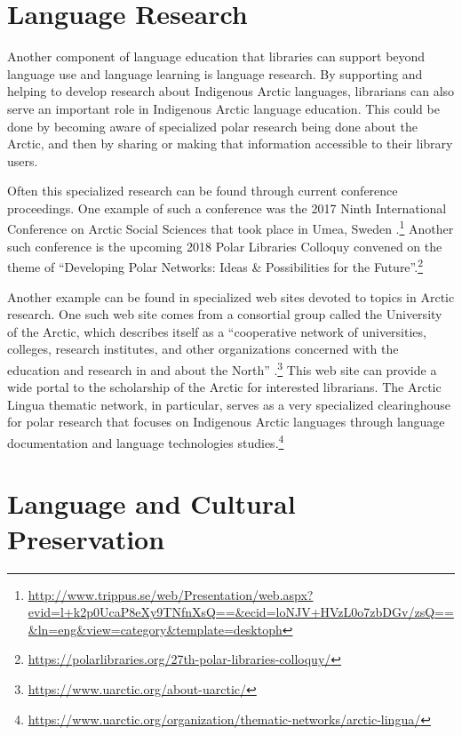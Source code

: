 \documentclass[a4paper,
fontsize=11pt,
oneside,
numbers=noperiodatend,
parskip=half-,
bibliography=totoc,
final
]{scrartcl}
\begin{document}
\hypertarget{language-research}{%
\section{Language Research}\label{language-research}}

Another component of language education that libraries can support
beyond language use and language learning is language research. By
supporting and helping to develop research about Indigenous Arctic
languages, librarians can also serve an important role in Indigenous
Arctic language education. This could be done by becoming aware of
specialized polar research being done about the Arctic, and then by
sharing or making that information accessible to their library users.

Often this specialized research can be found through current conference
proceedings. One example of such a conference was the 2017 Ninth
International Conference on Arctic Social Sciences that took place in
Umea, Sweden .\footnote{\url{http://www.trippus.se/web/Presentation/web.aspx?evid=l+k2p0UcaP8eXy9TNfnXsQ==\&ecid=loNJV+HVzL0o7zbDGv/zsQ==\&ln=eng\&view=category\&template=desktoph}}
Another such conference is the upcoming 2018 Polar Libraries Colloquy
convened on the theme of \enquote{Developing Polar Networks: Ideas \&
Possibilities for the Future}.\footnote{\url{https://polarlibraries.org/27th-polar-libraries-colloquy/}}

Another example can be found in specialized web sites devoted to topics
in Arctic research. One such web site comes from a consortial group
called the University of the Arctic, which describes itself as a
\enquote{cooperative network of universities, colleges, research
institutes, and other organizations concerned with the education and
research in and about the North} .\footnote{\url{https://www.uarctic.org/about-uarctic/}}
This web site can provide a wide portal to the scholarship of the Arctic
for interested librarians. The Arctic Lingua thematic network, in
particular, serves as a very specialized clearinghouse for polar
research that focuses on Indigenous Arctic languages through language
documentation and language technologies studies.\footnote{\url{https://www.uarctic.org/organization/thematic-networks/arctic-lingua/}}

\hypertarget{language-and-cultural-preservation}{%
\section{Language and Cultural
Preservation}\label{language-and-cultural-preservation}}
\end{document}
